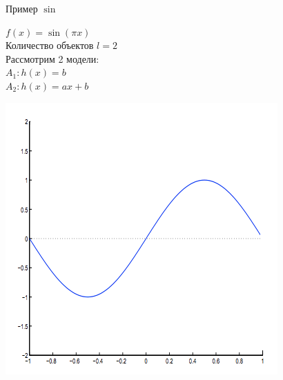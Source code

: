 \documentclass[10pt]{beamer}
\begin{document}

\begin{frame}{Пример $\sin$}
  \centering
  \begin{minipage}[b]{.45\textwidth}
    $f(x) = \sin (\pi x)$\\
    Количество объектов $l = 2$\\
    \bigbreak 
    Рассмотрим 2 модели:\\

      $A_1: h(x) = b$\\
      $A_2: h(x) = ax + b$

  \end{minipage}\qquad
  \begin{minipage}[b]{.45\textwidth}
    \includegraphics[width=\textwidth, keepaspectratio]{images/sin0}
  \end{minipage}
\end{frame}
\end{document}
